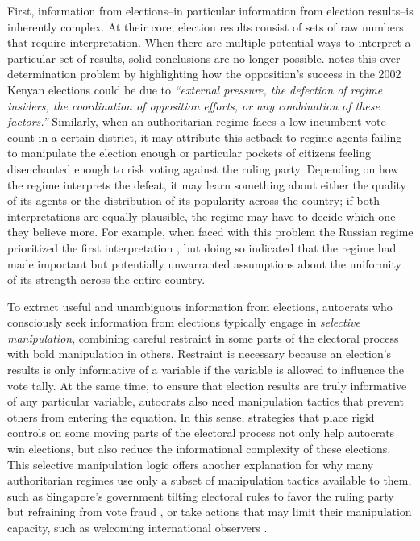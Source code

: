 \documentclass[12pt]{article}
\newcommand{\1}{\mathbbm{1}}
\begin{document}
First, information from elections--in particular information from election results--is inherently complex. At their core, election results consist of sets of raw numbers that require interpretation. When there are multiple potential ways to interpret a particular set of results, solid conclusions are no longer possible. \citet[][461]{Gandhi2015} notes this over-determination problem by highlighting how the opposition's success in the 2002 Kenyan elections could be due to \textit{``external pressure, the defection of regime insiders, the coordination of opposition efforts, or any combination of these factors.''} Similarly, when an authoritarian regime faces a low incumbent vote count in a certain district, it may attribute this setback to regime agents failing to manipulate the election enough or particular pockets of citizens feeling disenchanted enough to risk voting against the ruling party. Depending on how the regime interprets the defeat, it may learn something about either the quality of its agents or the distribution of its popularity across the country; if both interpretations are equally plausible, the regime may have to decide which one they believe more. For example, when faced with this problem the Russian regime prioritized the first interpretation \citep[][136]{Myagkov2009}, but doing so indicated that the regime had made important but potentially unwarranted assumptions about the uniformity of its strength across the entire country.

To extract useful and unambiguous information from elections, autocrats who consciously seek information from elections typically engage in \textit{selective manipulation}, combining careful restraint in some parts of the electoral process with bold manipulation in others. Restraint is necessary because an election's results is only informative of a variable if the variable is allowed to influence the vote tally. At the same time, to ensure that election results are truly informative of any particular variable, autocrats also need manipulation tactics that prevent others from entering the equation. In this sense, strategies that place rigid controls on some moving parts of the electoral process not only help autocrats win elections, but also reduce the informational complexity of these elections. This selective manipulation logic offers another explanation for why many authoritarian regimes use only a subset of manipulation tactics available to them, such as Singapore's government tilting electoral rules to favor the ruling party but refraining from vote fraud \citep{Tan2013}, or take actions that may limit their manipulation capacity, such as welcoming international observers \citep{Little2015}.
\end{document}
